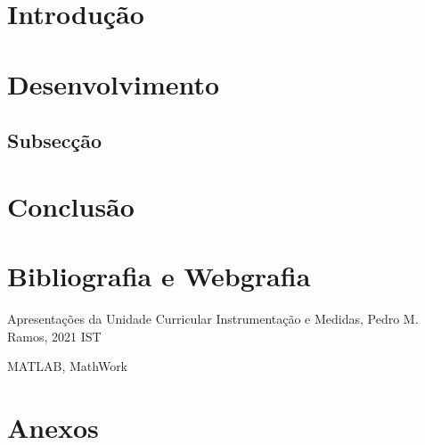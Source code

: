\documentclass[12pt]{article}
\begin{document}

%

\pagestyle{paging}

\renewcommand{\cftsecleader}{\cftdotfill{\cftdotsep}}
\renewcommand{\cftsecpagefont}{\normalfont}
\renewcommand{\cftsecfont}{\normalfont}
\tableofcontents 
\pagebreak

\section{Introdução}

\section{Desenvolvimento}

\subsection{Subsecção}

\section{Conclusão}

\section{Bibliografia e Webgrafia}
\vspace*{-0.6cm}
\begin{thebibliography}{10}

Apresentações da Unidade Curricular Instrumentação e Medidas, Pedro M. Ramos, 2021 IST

MATLAB, MathWork

\end{thebibliography}

\section{Anexos}
\end{document}
